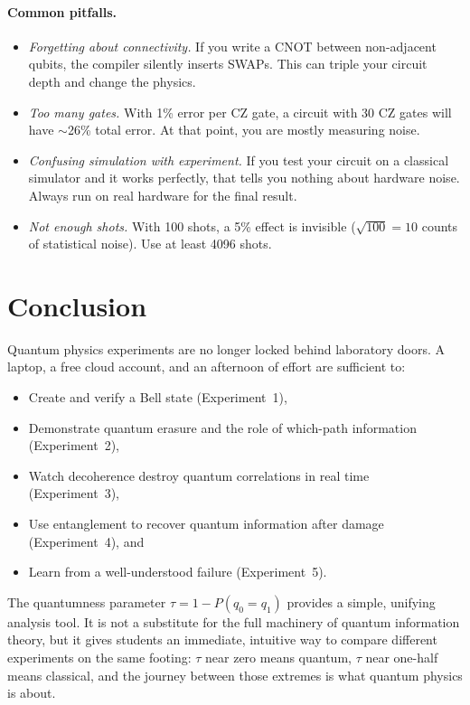 \documentclass[amsmath,amssymb,reprint,aps,prb]{revtex4-2}
\begin{document}
\paragraph{Common pitfalls.}
\begin{itemize}
\item \textit{Forgetting about connectivity.}  If you write a CNOT
  between non-adjacent qubits, the compiler silently inserts SWAPs.
  This can triple your circuit depth and change the physics.
\item \textit{Too many gates.}  With 1\% error per CZ gate, a
  circuit with 30 CZ gates will have $\sim$26\% total error.  At
  that point, you are mostly measuring noise.
\item \textit{Confusing simulation with experiment.}  If you test
  your circuit on a classical simulator and it works perfectly, that
  tells you nothing about hardware noise.  Always run on real
  hardware for the final result.
\item \textit{Not enough shots.}  With 100 shots, a 5\% effect is
  invisible ($\sqrt{100} = 10$ counts of statistical noise).  Use
  at least 4096 shots.
\end{itemize}


\section{Conclusion}
\label{sec:conclusion}

Quantum physics experiments are no longer locked behind
laboratory doors.  A laptop, a free cloud account, and an afternoon
of effort are sufficient to:
\begin{itemize}
\item Create and verify a Bell state (Experiment~1),
\item Demonstrate quantum erasure and the role of which-path
  information (Experiment~2),
\item Watch decoherence destroy quantum correlations in real
  time (Experiment~3),
\item Use entanglement to recover quantum information after
  damage (Experiment~4), and
\item Learn from a well-understood failure (Experiment~5).
\end{itemize}

The quantumness parameter $\tau = 1 - P(q_0 = q_1)$ provides a
simple, unifying analysis tool.  It is not a substitute for the
full machinery of quantum information theory, but it gives students
an immediate, intuitive way to compare different experiments on the
same footing: $\tau$ near zero means quantum, $\tau$ near one-half
means classical, and the journey between those extremes is what
quantum physics is about.
\end{document}
